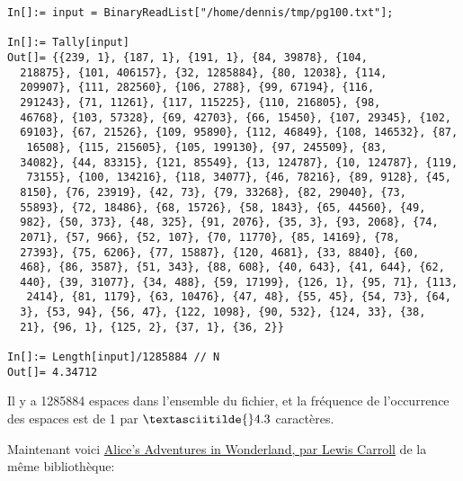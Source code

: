\begin{lstlisting}[caption=Mathematica,style=custommath]
In[]:= input = BinaryReadList["/home/dennis/tmp/pg100.txt"];

In[]:= Tally[input]
Out[]= {{239, 1}, {187, 1}, {191, 1}, {84, 39878}, {104, 
  218875}, {101, 406157}, {32, 1285884}, {80, 12038}, {114, 
  209907}, {111, 282560}, {106, 2788}, {99, 67194}, {116, 
  291243}, {71, 11261}, {117, 115225}, {110, 216805}, {98, 
  46768}, {103, 57328}, {69, 42703}, {66, 15450}, {107, 29345}, {102, 
  69103}, {67, 21526}, {109, 95890}, {112, 46849}, {108, 146532}, {87,
   16508}, {115, 215605}, {105, 199130}, {97, 245509}, {83, 
  34082}, {44, 83315}, {121, 85549}, {13, 124787}, {10, 124787}, {119,
   73155}, {100, 134216}, {118, 34077}, {46, 78216}, {89, 9128}, {45, 
  8150}, {76, 23919}, {42, 73}, {79, 33268}, {82, 29040}, {73, 
  55893}, {72, 18486}, {68, 15726}, {58, 1843}, {65, 44560}, {49, 
  982}, {50, 373}, {48, 325}, {91, 2076}, {35, 3}, {93, 2068}, {74, 
  2071}, {57, 966}, {52, 107}, {70, 11770}, {85, 14169}, {78, 
  27393}, {75, 6206}, {77, 15887}, {120, 4681}, {33, 8840}, {60, 
  468}, {86, 3587}, {51, 343}, {88, 608}, {40, 643}, {41, 644}, {62, 
  440}, {39, 31077}, {34, 488}, {59, 17199}, {126, 1}, {95, 71}, {113,
   2414}, {81, 1179}, {63, 10476}, {47, 48}, {55, 45}, {54, 73}, {64, 
  3}, {53, 94}, {56, 47}, {122, 1098}, {90, 532}, {124, 33}, {38, 
  21}, {96, 1}, {125, 2}, {37, 1}, {36, 2}}

In[]:= Length[input]/1285884 // N
Out[]= 4.34712
\end{lstlisting}

Il y a 1285884 espaces dans l'ensemble du fichier, et la fréquence de l'occurrence
des espaces est de 1 par $\textasciitilde{}4.3$ caractères.

Maintenant voici \href{http://www.gutenberg.org/ebooks/11}{Alice's Adventures in Wonderland, par Lewis Carroll}
de la même bibliothèque:

